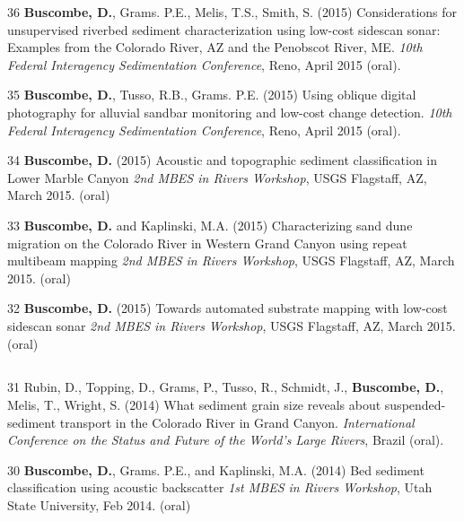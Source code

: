 \documentclass[margin,line]{resume}
\begin{document}
\begin{resume}
\begin{footnotesize}
\begin{list1}
        \item[36] {\bf Buscombe, D.}, Grams. P.E., Melis, T.S., Smith, S. (2015) Considerations for unsupervised riverbed sediment characterization using low-cost sidescan sonar: Examples from the Colorado River, AZ and the Penobscot River, ME. {\sl 10th Federal Interagency Sedimentation Conference}, Reno, April 2015 (oral).\\

        \item[35] {\bf Buscombe, D.}, Tusso, R.B., Grams. P.E. (2015) Using oblique digital photography for alluvial sandbar monitoring and low-cost change detection. {\sl 10th Federal Interagency Sedimentation Conference}, Reno, April 2015 (oral).\\

        \item[34] {\bf Buscombe, D.} (2015) Acoustic and topographic sediment classification in Lower Marble Canyon {\sl 2nd MBES in Rivers Workshop}, USGS Flagstaff, AZ, March 2015. (oral)\\
        
        \item[33] {\bf Buscombe, D.} and Kaplinski, M.A. (2015) Characterizing sand dune migration on the Colorado River in Western Grand Canyon using repeat multibeam mapping {\sl 2nd MBES in Rivers Workshop}, USGS Flagstaff, AZ, March 2015. (oral)\\

        \item[32] {\bf Buscombe, D.} (2015) Towards automated substrate mapping with low-cost sidescan sonar {\sl 2nd MBES in Rivers Workshop}, USGS Flagstaff, AZ, March 2015. (oral)
        
	\end{list1}

	\subsection{}
	\begin{list1}
        \item[31] Rubin, D., Topping, D., Grams, P., Tusso, R., Schmidt, J., {\bf Buscombe, D.}, Melis, T., Wright, S. (2014) What sediment grain size reveals about suspended-sediment transport in the Colorado River in Grand Canyon. {\sl International Conference on the Status and Future of the World's Large Rivers}, Brazil (oral).\\

        \item[30] {\bf Buscombe, D.}, Grams. P.E., and Kaplinski, M.A. (2014) Bed sediment classification using acoustic backscatter {\sl 1st MBES in Rivers Workshop}, Utah State University, Feb 2014. (oral)\\


\end{list1}
\end{footnotesize}
\end{resume}
\end{document}
